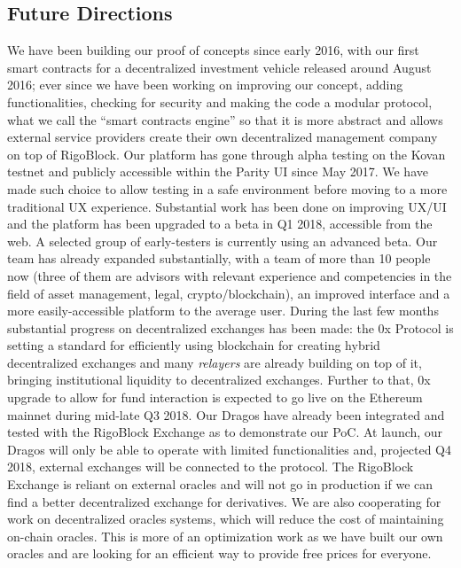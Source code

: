 \documentclass[9pt,oneside]{amsart}
\begin{document}
\begin{multicols}{2}
\section{Future Directions} \label{ch:future}
We have been building our proof of concepts since early 2016, with our first smart contracts for a decentralized investment vehicle released around August 2016; ever since we have been working on improving our concept, adding functionalities, checking for security and making the code a modular protocol, what we call the “smart contracts engine” so that it is more abstract and allows external service providers create their own decentralized management company on top of RigoBlock. Our platform has gone through alpha testing on the Kovan testnet and publicly accessible within the Parity UI since May 2017. We have made such choice to allow testing in a safe environment before moving to a more traditional UX experience.
Substantial work has been done on improving UX/UI and the platform has been upgraded to a beta in Q1 2018, accessible from the web. A selected group of early-testers is currently using an advanced beta. Our team has already expanded substantially, with a team of more than 10 people now (three of them are advisors with relevant experience and competencies in the field of asset management, legal, crypto/blockchain), an improved interface and a more easily-accessible platform to the average user.
During the last few months substantial progress on decentralized exchanges has been made: the 0x Protocol is setting a standard for efficiently using blockchain for creating hybrid decentralized exchanges and many \textit{relayers} are already building on top of it, bringing institutional liquidity to decentralized exchanges. Further to that, 0x upgrade to allow for fund interaction is expected to go live on the Ethereum mainnet during mid-late Q3 2018.
Our Dragos have already been integrated and tested with the RigoBlock Exchange as to demonstrate our PoC. At launch, our Dragos will only be able to operate with limited functionalities and, projected Q4 2018, external exchanges will be connected to the protocol.
The RigoBlock Exchange is reliant on external oracles and will not go in production if we can find a better decentralized exchange for derivatives. We are also cooperating for work on decentralized oracles systems, which will reduce the cost of maintaining on-chain oracles. This is more of an optimization work as we have built our own oracles and are looking for an efficient way to provide free prices for everyone.

\end{multicols}
\end{document}
